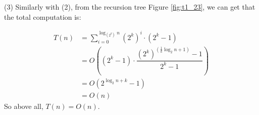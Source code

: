 (3) Similarly with (2), from the recursion tree Figure \ref{fig:t1_23}, we can get that the total computation is:

\begin{align*}
    T(n) &= \sum_{i=0}^{\log_{(2^k)}{n}}(2^k)^i\cdot (2^k-1)\\
         &= O((2^k-1)\cdot \dfrac{(2^k)^{(\frac{1}{k}\log_{2}{n}+1)}-1}{2^k-1})\\
         &= O(2^{\log_{2}{n}+k}-1)\\
         &= O(n)
\end{align*}
So above all, $T(n)=O(n)$.\\



\newpage